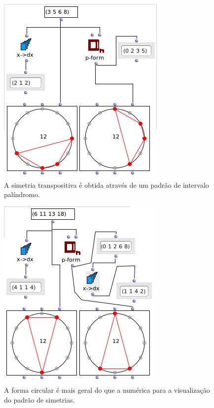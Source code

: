 \documentclass[
	12pt,				%
	openright,			%
	twoside,			%
	a4paper,			%
	english,			%
	french,				%
	spanish,			%
	brazil				%
	]{abntex2}
\begin{document}
\begin{apendicesenv}
\begin{figure}[!h]
	\caption{\label{fig_grafico}A simetria transpositiva é obtida através de um padrão de intervalo palíndromo. }
	\begin{center}
	    \includegraphics[scale=0.6]{OM_settheory/palindrome1.png}
	\end{center}
\end{figure}



\begin{figure}[!h]
	\caption{\label{fig_grafico}A forma circular é mais geral do que a numérica para a visualização do padrão de simetrias. }
	\begin{center}
	    \includegraphics[scale=0.6]{OM_settheory/palindrome2.png}
	\end{center}
\end{figure}




\end{apendicesenv}
\end{document}
